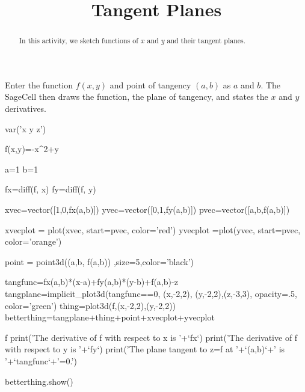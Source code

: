 \documentclass{ximera}
\title{Tangent Planes}
\begin{document}
      
\begin{abstract}
      
In this activity, we sketch functions of $x$ and $y$ and their tangent planes.
      
\end{abstract}
      
\maketitle
      

Enter the function $f(x,y)$ and point of tangency $(a,b)$ as $a$ and $b$.  The SageCell then draws the function, the plane of tangency, and states the $x$ and $y$ derivatives.


\begin{sageCell}
var('x y z') 



f(x,y)=-x^2+y

a=1
b=1


fx=diff(f, x)
fy=diff(f, y)

xvec=vector([1,0,fx(a,b)])
yvec=vector([0,1,fy(a,b)])
pvec=vector([a,b,f(a,b)])

xvecplot = plot(xvec, start=pvec, color='red')
yvecplot =plot(yvec, start=pvec, color='orange')
              
point = point3d((a,b, f(a,b)) ,size=5,color='black')

tangfunc=fx(a,b)*(x-a)+fy(a,b)*(y-b)+f(a,b)-z
tangplane=implicit_plot3d(tangfunc==0, (x,-2,2), (y,-2,2),(z,-3,3), opacity=.5, color='green')
thing=plot3d(f,(x,-2,2),(y,-2,2))
betterthing=tangplane+thing+point+xvecplot+yvecplot

f
print('The derivative of f with respect to x is '+`fx`)
print('The derivative of f with respect to y is '+`fy`)
print('The plane tangent to z=f at '+`(a,b)`+' is '+`tangfunc`+'=0.')


betterthing.show()
\end{sageCell}






 
 
 
 
      
\end{document}
